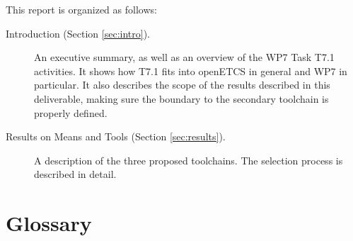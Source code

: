 This report is organized as follows:

\begin{description}
\item[Introduction (Section \ref{sec:intro}).] An executive summary, as well as an overview of the WP7 Task T7.1 activities.  It shows how T7.1 fits into openETCS in general and WP7 in particular.  It also describes the scope of the results described in this deliverable, making sure the boundary to the secondary toolchain is properly defined.

\item[Results on Means and Tools (Section \ref{sec:results}).] A description of the three proposed toolchains.  The selection process is described in detail.

\end{description}










\section{Glossary}
\label{sec:glossary}

